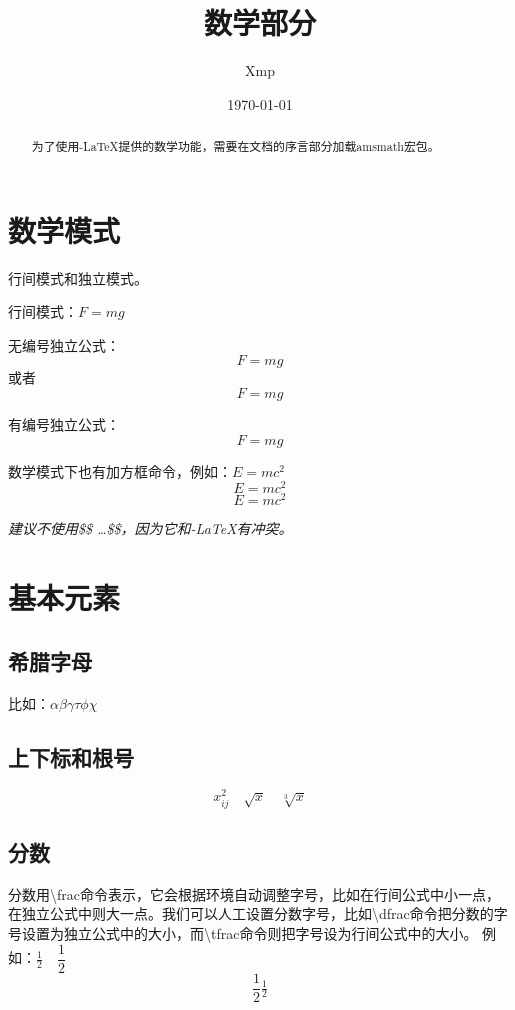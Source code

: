 \documentclass[UTF8]{article}
\title{数学部分}
\author{Xmp}
\date{\today}
\begin{document}
\maketitle
\setcounter{tocdepth}{9}
\tableofcontents

\begin{abstract}
	为了使用\AmS-\LaTeX 提供的数学功能，需要在文档的序言部分加载amsmath宏包。
\end{abstract}

\section{数学模式}
行间模式和独立模式。

行间模式：$F=mg$

无编号独立公式：$$F=mg$$或者\begin{equation*}
	F=mg
\end{equation*}

有编号独立公式：\begin{equation}
	F=mg
\end{equation}

数学模式下也有加方框命令，例如：$E=mc^2$
\[E=mc^2\]
\[\boxed{E=mc^2}\]

\emph{建议不使用\$\$ \dots \$\$，因为它和\AmS-\LaTeX 有冲突。}

\section{基本元素}
\subsection{希腊字母}
比如：$\alpha \beta \gamma \tau \phi \chi$

\subsection{上下标和根号}
\[x_{ij}^2 \quad \sqrt{x} \quad \sqrt[3]{x} \]

\subsection{分数}
分数用\textbackslash frac命令表示，它会根据环境自动调整字号，比如在行间公式中小一点，在独立公式中则大一点。我们可以人工设置分数字号，比如\textbackslash dfrac命令把分数的字号设置为独立公式中的大小，而\textbackslash tfrac命令则把字号设为行间公式中的大小。
例如：$\frac{1}{2} \quad \dfrac{1}{2}$
\[\frac{1}{2} \tfrac{1}{2}\]
\end{document}
